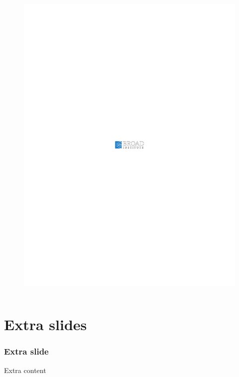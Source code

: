\documentclass[pdf, usepdftitle=false]{beamer}
\begin{document}
\begin{frame}
\begin{columns}
\begin{column}{0.33\textwidth}
\begin{figure}[b]
\includegraphics[width=\textwidth]{broad}
\end{figure}
\end{column}
\end{columns}
\end{frame}


\section[]{Extra slides} %


\begin{frame}
\frametitle{Extra slide}
Extra content
\end{frame}
\end{document}
